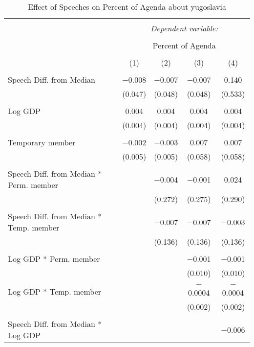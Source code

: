 
\begin{table}[!htbp] \centering 
  \caption{Effect of Speeches on Percent of Agenda about yugoslavia} 
  \label{} 
\begin{tabular}{@{\extracolsep{5pt}}lcccc} 
\\[-1.8ex]\hline 
\hline \\[-1.8ex] 
 & \multicolumn{4}{c}{\textit{Dependent variable:}} \\ 
\cline{2-5} 
\\[-1.8ex] & \multicolumn{4}{c}{Percent of Agenda} \\ 
\\[-1.8ex] & (1) & (2) & (3) & (4)\\ 
\hline \\[-1.8ex] 
 Speech Diff. from Median & $-$0.008 & $-$0.007 & $-$0.007 & 0.140 \\ 
  & (0.047) & (0.048) & (0.048) & (0.533) \\ 
  & & & & \\ 
 Log GDP & 0.004 & 0.004 & 0.004 & 0.004 \\ 
  & (0.004) & (0.004) & (0.004) & (0.004) \\ 
  & & & & \\ 
 Temporary member & $-$0.002 & $-$0.003 & 0.007 & 0.007 \\ 
  & (0.005) & (0.005) & (0.058) & (0.058) \\ 
  & & & & \\ 
 Speech Diff. from Median * Perm. member &  & $-$0.004 & $-$0.001 & 0.024 \\ 
  &  & (0.272) & (0.275) & (0.290) \\ 
  & & & & \\ 
 Speech Diff. from Median * Temp. member &  & $-$0.007 & $-$0.007 & $-$0.003 \\ 
  &  & (0.136) & (0.136) & (0.136) \\ 
  & & & & \\ 
 Log GDP * Perm. member &  &  & $-$0.001 & $-$0.001 \\ 
  &  &  & (0.010) & (0.010) \\ 
  & & & & \\ 
 Log GDP * Temp. member &  &  & $-$0.0004 & $-$0.0004 \\ 
  &  &  & (0.002) & (0.002) \\ 
  & & & & \\ 
 Speech Diff. from Median * Log GDP &  &  &  & $-$0.006 \\ 

\end{tabular}
\end{table}
